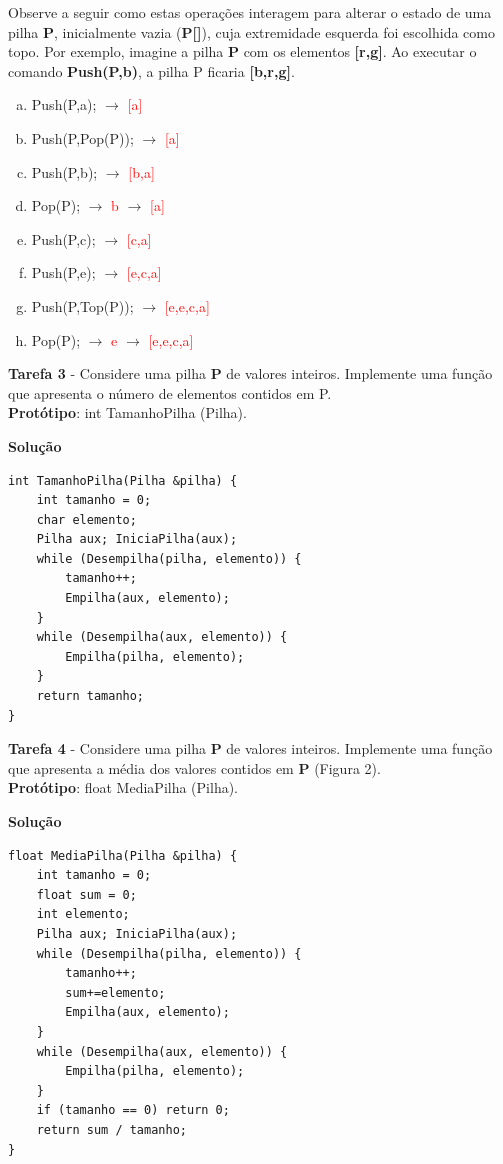 \documentclass{article}
\begin{document}
\par
\noindent
Observe a seguir como estas operações interagem para alterar o estado de uma pilha \textbf{P}, inicialmente vazia (\textbf{P[]}), cuja extremidade esquerda foi escolhida como topo. Por exemplo, imagine a pilha \textbf{P} com os elementos \textbf{[r,g]}. Ao executar o comando \textbf{Push(P,b)}, a pilha P ficaria \textbf{[b,r,g]}.
\begin{enumerate}[(a)]
    \item Push(P,a); \( \rightarrow \) \textcolor{red}{[a]}
    \item Push(P,Pop(P)); \( \rightarrow \) \textcolor{red}{[a]}
    \item Push(P,b); \( \rightarrow \) \textcolor{red}{[b,a]}
    \item Pop(P); \( \rightarrow \) \textcolor{red}{b} \( \rightarrow \) \textcolor{red}{[a]}
    \item Push(P,c); \( \rightarrow \) \textcolor{red}{[c,a]}
    \item Push(P,e); \( \rightarrow \) \textcolor{red}{[e,c,a]}
    \item Push(P,Top(P)); \( \rightarrow \) \textcolor{red}{[e,e,c,a]}
    \item Pop(P); \( \rightarrow \) \textcolor{red}{e} \( \rightarrow \) \textcolor{red}{[e,e,c,a]}
\end{enumerate}

\bigskip

\par
\noindent
\textbf{Tarefa 3} - Considere uma pilha \textbf{P} de valores inteiros. Implemente uma função que apresenta o número de elementos contidos em P.\\
\textbf{Protótipo}: int TamanhoPilha (Pilha).

\bigskip
\par
\noindent
\textbf{Solução}
\begin{lstlisting}
int TamanhoPilha(Pilha &pilha) {
    int tamanho = 0;
    char elemento;
    Pilha aux; IniciaPilha(aux);
    while (Desempilha(pilha, elemento)) {
        tamanho++;
        Empilha(aux, elemento);
    }
    while (Desempilha(aux, elemento)) {
        Empilha(pilha, elemento);
    }
    return tamanho;
}
\end{lstlisting}

\bigskip

\par
\noindent
\textbf{Tarefa 4} - Considere uma pilha \textbf{P} de valores inteiros. Implemente uma função que apresenta a média dos valores contidos em \textbf{P} (Figura 2).\\
\textbf{Protótipo}: float MediaPilha (Pilha).
\bigskip
\par
\noindent
\textbf{Solução}
\begin{lstlisting}
float MediaPilha(Pilha &pilha) {
    int tamanho = 0;
    float sum = 0;
    int elemento;
    Pilha aux; IniciaPilha(aux);
    while (Desempilha(pilha, elemento)) {
        tamanho++;
        sum+=elemento;
        Empilha(aux, elemento);
    }
    while (Desempilha(aux, elemento)) {
        Empilha(pilha, elemento);
    }
    if (tamanho == 0) return 0;
    return sum / tamanho;
}
\end{lstlisting}
\end{document}
